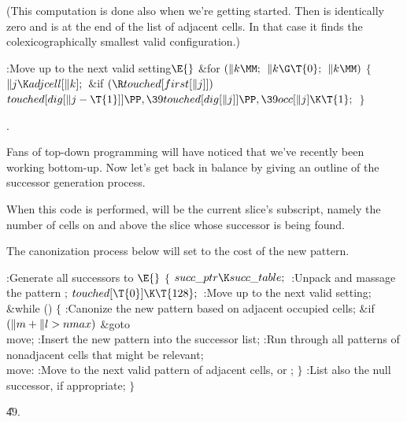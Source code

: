 (This computation is done also when we're getting started. Then  is
identically zero and  is at the end of the list of adjacent cells.
In that case it finds the colexicographically smallest valid configuration.)

\Y\B\4:Move up to the next valid setting\X${}\E{}$\6
\&{for} ${}(\|k\MM;{}$ ${}\|k\G\T{0};{}$ ${}\|k\MM){}$\5
${}\{{}$\1\6
${}\|j\K\\{adjcell}[\|k];{}$\6
\&{if} ${}(\R\\{touched}[\\{first}[\|j]]){}$\1\5
${}\\{touched}[\\{dig}[\|j-\T{1}]]\PP,\39\\{touched}[\\{dig}[\|j]]\PP,\39%
\\{occ}[\|j]\K\T{1};{}$\2\6
\4${}\}{}$\2\par
{}.\fi

Fans of top-down programming will have noticed that we've
recently been
working bottom-up. Now let's get back in balance by giving an outline of
the successor generation process.

When this code is performed,  will be the current slice's subscript,
namely
the number of cells on and above the slice whose successor is being
found.

The canonization process below will set  to the cost of the new
pattern.

\Y\B\4:Generate all successors to \X${}\E{}$\6
${}\{{}$\1\6
${}\\{succ\_ptr}\K\\{succ\_table};{}$\6
:Unpack and massage the pattern \X;\6
${}\\{touched}[\T{0}]\K\T{128};{}$\6
:Move up to the next valid setting\X;\6
\&{while} ()\5
${}\{{}$\1\6
:Canonize the new pattern based on adjacent occupied cells\X;\6
\&{if} ${}(\|m+\|l>\\{nmax}){}$\1\5
\&{goto} \\{move};\2\6
:Insert the new pattern into the successor list\X;\6
:Run through all patterns of nonadjacent cells that might be relevant\X;\6
\4\\{move}:\5
:Move to the next valid pattern of adjacent cells, or \X;\6
\4${}\}{}$\2\6
:List also the null successor, if appropriate\X;\6
\4${}\}{}$\2\par
\U49.\fi

